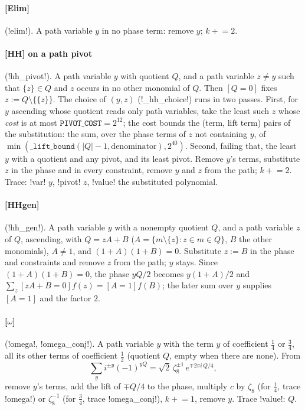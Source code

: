 \paragraph{[Elim]} (\code!elim!). A path variable $y$ in no phase term: remove $y$; $k\mathrel{+}=2$.

\paragraph{[HH] on a path pivot} (\code!hh_pivot!). A path variable $y$ with quotient $Q$, and a path variable $z\ne y$ such that $\{z\}\in Q$ and $z$ occurs in no other monomial of $Q$. Then $[Q=0]$ fixes $z:=Q\setminus\{\{z\}\}$. The choice of $(y,z)$ (\py!_hh_choice!) runs in two passes. First, for $y$ ascending whose quotient reads only path variables, take the least such $z$ whose \emph{cost} is at most $\mathtt{PIVOT\_COST}=2^{12}$; the cost bounds the (term, lift term) pairs of the substitution: the sum, over the phase terms of $z$ not containing $y$, of $\min(\mathtt{\_lift\_bound}(|Q|-1,\text{denominator}),2^{40})$. Second, failing that, the least $y$ with a quotient and any pivot, and its least pivot. Remove $y$'s terms, substitute $z$ in the phase and in every constraint, remove $y$ and $z$ from the path; $k\mathrel{+}=2$. Trace: \code!var! $y$, \code!pivot! $z$, \code!value! the substituted polynomial.

\paragraph{[HHgen]} (\code!hh_gen!). A path variable $y$ with a nonempty quotient $Q$, and a path variable $z$ of $Q$, ascending, with $Q=zA+B$ ($A=\{m\setminus\{z\}:z\in m\in Q\}$, $B$ the other monomials), $A\ne 1$, and $(1+A)(1+B)=0$. Substitute $z:=B$ in the phase and constraints and remove $z$ from the path; $y$ stays. Since $(1+A)(1+B)=0$, the phase $yQ/2$ becomes $y(1+A)/2$ and $\sum_z[zA+B=0]f(z)=[A=1]f(B)$; the later sum over $y$ supplies $[A=1]$ and the factor $2$.

\paragraph{[$\omega$]} (\code!omega!, \code!omega_conj!). A path variable $y$ with the term $y$ of coefficient $\tfrac14$ or $\tfrac34$, all its other terms of coefficient $\tfrac12$ (quotient $Q$, empty when there are none). From
\begin{equation}
\sum_{y}i^{\pm y}(-1)^{yQ}=\sqrt2\,\zeta_8^{\pm1}\,e^{\mp2\pi i\,Q/4},
\end{equation}
remove $y$'s terms, add the lift of $\mp Q/4$ to the phase, multiply $c$ by $\zeta_8$ (for $\tfrac14$, trace \code!omega!) or $\zeta_8^{-1}$ (for $\tfrac34$, trace \code!omega_conj!), $k\mathrel{+}=1$, remove $y$. Trace \code!value!: $Q$.

